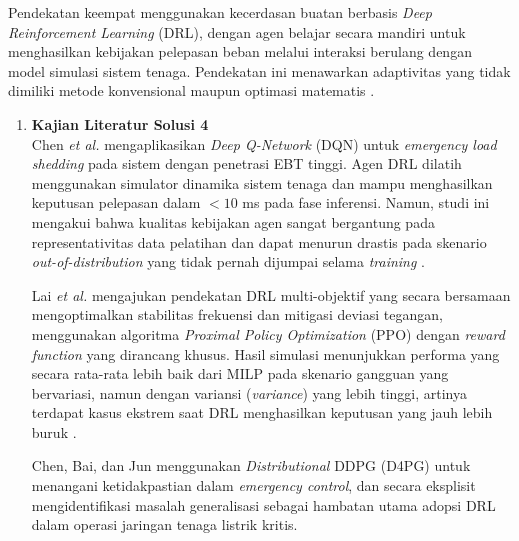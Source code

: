 Pendekatan keempat menggunakan kecerdasan buatan berbasis \textit{Deep Reinforcement Learning} (DRL), dengan agen belajar secara mandiri untuk menghasilkan kebijakan pelepasan beban melalui interaksi berulang dengan model simulasi sistem tenaga. Pendekatan ini menawarkan adaptivitas yang tidak dimiliki metode konvensional maupun optimasi matematis \cite{Chen2023, Lai2026, ChenBai2020}.

\begin{enumerate}
\item[a.] \textbf{Kajian Literatur Solusi 4} \\
Chen \textit{et al.} \cite{Chen2023} mengaplikasikan \textit{Deep Q-Network} (DQN) untuk \textit{emergency load shedding} pada sistem dengan penetrasi EBT tinggi. Agen DRL dilatih menggunakan simulator dinamika sistem tenaga dan mampu menghasilkan keputusan pelepasan dalam $< 10$ ms pada fase inferensi. Namun, studi ini mengakui bahwa kualitas kebijakan agen sangat bergantung pada representativitas data pelatihan dan dapat menurun drastis pada skenario \textit{out-of-distribution} yang tidak pernah dijumpai selama \textit{training} \cite{Chen2023}.

Lai \textit{et al.} \cite{Lai2026} mengajukan pendekatan DRL multi-objektif yang secara bersamaan mengoptimalkan stabilitas frekuensi dan mitigasi deviasi tegangan, menggunakan algoritma \textit{Proximal Policy Optimization} (PPO) dengan \textit{reward function} yang dirancang khusus. Hasil simulasi menunjukkan performa yang secara rata-rata lebih baik dari MILP pada skenario gangguan yang bervariasi, namun dengan variansi (\textit{variance}) yang lebih tinggi, artinya terdapat kasus ekstrem saat DRL menghasilkan keputusan yang jauh lebih buruk \cite{Lai2026}.

Chen, Bai, dan Jun \cite{ChenBai2020} menggunakan \textit{Distributional} DDPG (D4PG) untuk menangani ketidakpastian dalam \textit{emergency control}, dan secara eksplisit mengidentifikasi masalah generalisasi sebagai hambatan utama adopsi DRL dalam operasi jaringan tenaga listrik kritis.


\end{enumerate}
